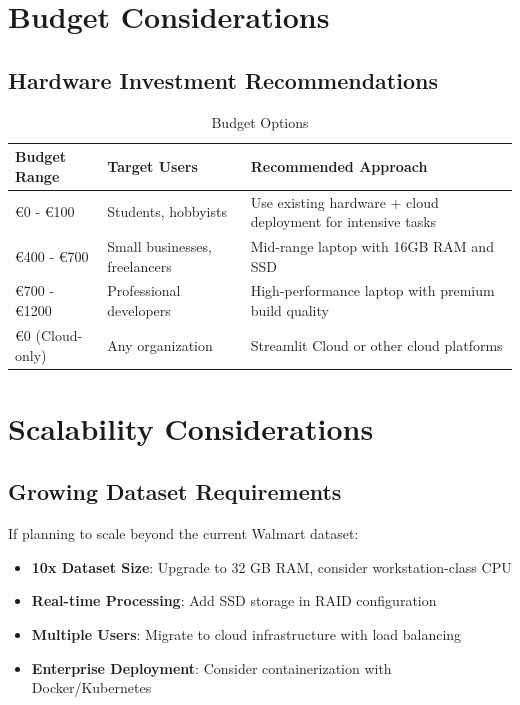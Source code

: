 \section*{Budget Considerations}

\subsection*{Hardware Investment Recommendations}

\begin{table}[H]
	\centering
	\caption{Budget Options}
	\begin{tabular}{|p{3cm}|p{3cm}|p{7cm}|}
		\hline
		\textbf{Budget Range} & \textbf{Target Users} & \textbf{Recommended Approach} \\
		\hline
		€0 - €100 & Students, hobbyists & Use existing hardware + cloud deployment for intensive tasks \\
		\hline
		€400 - €700 & Small businesses, freelancers & Mid-range laptop with 16GB RAM and SSD \\
		\hline
		€700 - €1200 & Professional developers & High-performance laptop with premium build quality \\
		\hline
		€0 (Cloud-only) & Any organization & Streamlit Cloud or other cloud platforms \\
		\hline
	\end{tabular}
	\label{tab:budget-options}
\end{table}

\section*{Scalability Considerations}

\subsection*{Growing Dataset Requirements}

If planning to scale beyond the current Walmart dataset:

\begin{itemize}
	\item \textbf{10x Dataset Size}: Upgrade to 32 GB RAM, consider workstation-class CPU
	\item \textbf{Real-time Processing}: Add SSD storage in RAID configuration
	\item \textbf{Multiple Users}: Migrate to cloud infrastructure with load balancing
	\item \textbf{Enterprise Deployment}: Consider containerization with Docker/Kubernetes
\end{itemize}

